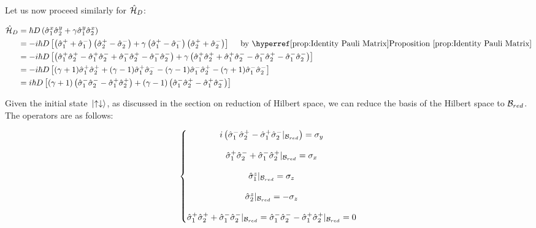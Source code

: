 Let us now proceed similarly for $\hat{\mathcal{H}}_{D}$:

\begin{align*}
	\hamil_{D} &= \hbar D \left( 
	\sx{1} \sy{2} + \gamma \sy{1} \sx{2}
	\right) \\
	&= - i\hbar D 
	\left[ \left(\splus{1} + \sminus{1}  \right) 
	\left(\splus{2} - \sminus{2}  \right) + \gamma
	\left(\splus{1} - \sminus{1}  \right) 
	\left(\splus{2} + \sminus{2}  \right) \right]
	\ \ \ \  
	\text{by \refprop{prop:Identity Pauli Matrix}} \\
	&=-i\hbar D 
	\left[ \left(
	\splus{1} \splus{2} -
	\splus{1} \sminus{2} +
	\sminus{1}  \splus{2} -
	\sminus{1} \sminus{2} \right) 
	+ \gamma
	\left(\splus{1} \splus{2} +
	\splus{1} \sminus{2} -
	\sminus{1}  \splus{2} -
	\sminus{1} \sminus{2} \right)
	\right] \\
	&=
	-i\hbar D 
	\left[ (\gamma + 1) 
	\splus{1} \splus{2} +
	(\gamma - 1) \splus{1} \sminus{2} -
	(\gamma-1) \sminus{1}  \splus{2} 
	-(\gamma + 1)\sminus{1} \sminus{2} 
	\right] \\
	&=
	i\hbar D 
	\left[ \left(\gamma + 1 \right) \left(\sminus{1} \sminus{2}
	- \splus{1} \splus{2}  \right)  + 
	\left(\gamma - 1 \right) \left(
		\sminus{1} \splus{2} - 
		\splus{1} \sminus{2}\right) 
	\right]
\end{align*}

Given the initial state $\ket*{\uparrow \downarrow}$, as discussed in the section on reduction of Hilbert space, we can reduce the basis of the Hilbert space to $\mathcal{B}_{red}$. The operators are as follows:



\begin{equation}
	\left\{\begin{matrix}
		i\left(\hat{\sigma}_{1}^- \hat{\sigma}_{2}^+ - 
		\hat{\sigma}_{1}^+ \hat{\sigma}_{2}^- |_{\mathcal{B}_{red}}\right) = \sigma_y 	\\
		\\
		\hat{\sigma}_{1}^+ \hat{\sigma}_{2}^- 
		+ \hat{\sigma}_{1}^- \hat{\sigma}_{2}^+ |_{\mathcal{B}_{red}} = \sigma_x \\
		\\
		\hat{\sigma}_{1}^z|_{\mathcal{B}_{red}} = \sigma_z \\
		\\

		\hat{\sigma}_{2}^z|_{\mathcal{B}_{red}} = -\sigma_z \\
		\\
		\hat{\sigma}_{1}^+ \hat{\sigma}_{2}^+ 
		+ \hat{\sigma}_{1}^- \hat{\sigma}_{2}^- |_{\mathcal{B}_{red}}
		= \hat{\sigma}_{1}^- \hat{\sigma}_{2}^-
		- \hat{\sigma}_{1}^+ \hat{\sigma}_{2}^+ |_{\mathcal{B}_{red}} 
		= 0
	   \end{matrix}\right.
\end{equation}

